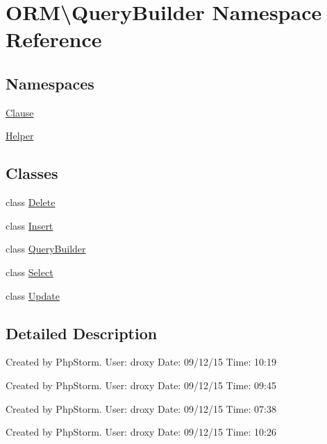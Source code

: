 \hypertarget{namespaceORM_1_1QueryBuilder}{}\section{O\+RM\textbackslash{}Query\+Builder Namespace Reference}
\label{namespaceORM_1_1QueryBuilder}
\subsection*{Namespaces}
\begin{DoxyCompactItemize}
\item 
 \hyperlink{namespaceORM_1_1QueryBuilder_1_1Clause}{Clause}
\item 
 \hyperlink{namespaceORM_1_1QueryBuilder_1_1Helper}{Helper}
\end{DoxyCompactItemize}
\subsection*{Classes}
\begin{DoxyCompactItemize}
\item 
class \hyperlink{classORM_1_1QueryBuilder_1_1Delete}{Delete}
\item 
class \hyperlink{classORM_1_1QueryBuilder_1_1Insert}{Insert}
\item 
class \hyperlink{classORM_1_1QueryBuilder_1_1QueryBuilder}{Query\+Builder}
\item 
class \hyperlink{classORM_1_1QueryBuilder_1_1Select}{Select}
\item 
class \hyperlink{classORM_1_1QueryBuilder_1_1Update}{Update}
\end{DoxyCompactItemize}


\subsection{Detailed Description}
Created by Php\+Storm. User\+: droxy Date\+: 09/12/15 Time\+: 10\+:19

Created by Php\+Storm. User\+: droxy Date\+: 09/12/15 Time\+: 09\+:45

Created by Php\+Storm. User\+: droxy Date\+: 09/12/15 Time\+: 07\+:38

Created by Php\+Storm. User\+: droxy Date\+: 09/12/15 Time\+: 10\+:26 